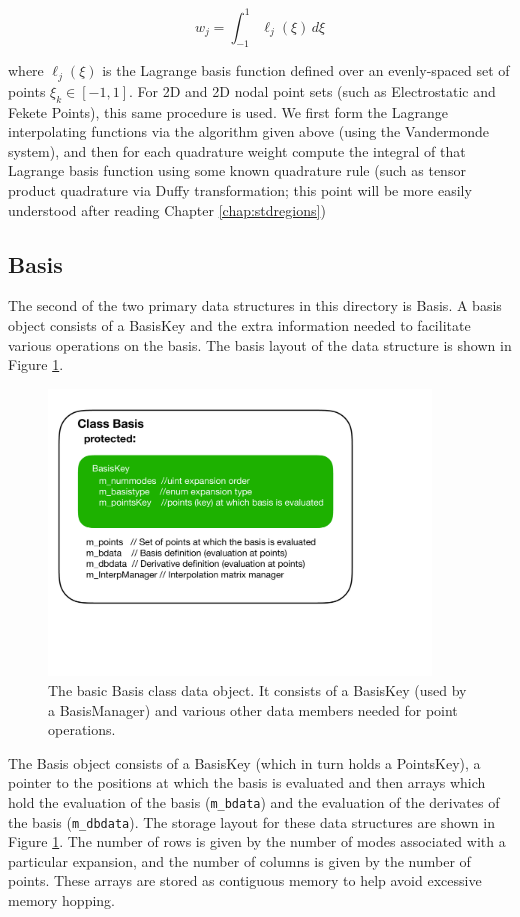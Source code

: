 \[
w_j = \int_{-1}^1 \ell_j(\xi)\, d\xi
\]

\noindent where $\ell_j(\xi)$ is the Lagrange basis function defined over an evenly-spaced set of points $\xi_k \in [-1,1]$.
For 2D and 2D nodal point sets (such as Electrostatic and Fekete Points), this same procedure is used.   We first form the
Lagrange interpolating functions via the algorithm given above (using the Vandermonde system), and then for each 
quadrature weight compute the integral of that Lagrange basis function using some known quadrature rule (such as
tensor product quadrature via Duffy transformation; this point will be more easily understood after reading Chapter
\ref{chap:stdregions})




\subsection{Basis}
The second of the two primary data structures in this directory is Basis. 
A basis object consists of a BasisKey and the extra information needed
to facilitate various operations on the basis.  The basis layout of the data 
structure is shown in Figure \ref{foundations:basisclass}.  

\begin{figure}[htb]
\centering
\includegraphics[width=4in]{img/basisclass.pdf}
\caption{The basic Basis class data object.  It consists of a BasisKey (used by a BasisManager) and various other data members needed for point operations.}
\label{foundations:basisclass}
\end{figure}


The Basis
object consists of a BasisKey (which in turn holds a PointsKey), 
a pointer to the positions at which the basis is evaluated and then
arrays which hold the evaluation of the basis (\verb+m_bdata+) and
the evaluation of the derivates of the basis (\verb+m_dbdata+).
The storage layout for these data structures are shown in 
Figure \ref{foundations:basisclass}.  The number of rows is given by 
the number of modes associated with a particular expansion, and the
number of columns is given by the number of points.  These arrays are stored
as contiguous memory to help avoid excessive memory hopping. 
      
